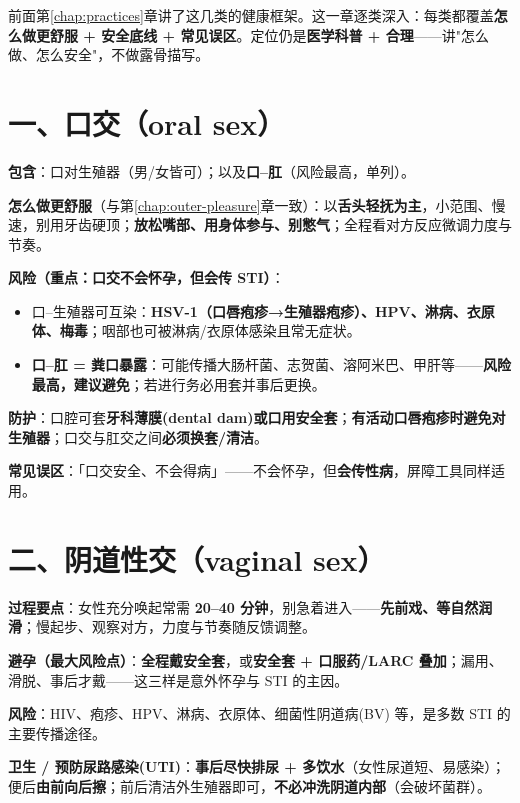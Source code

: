 \label{chap:threeparts}

前面第\ref{chap:practices}章讲了这几类的健康框架。这一章逐类深入：每类都覆盖\textbf{怎么做更舒服 + 安全底线 + 常见误区}。定位仍是\textbf{医学科普 + 合理}——讲"怎么做、怎么安全"，不做露骨描写。

\section{一、口交（oral sex）}

\textbf{包含}：口对生殖器（男/女皆可）；以及\textbf{口--肛}（风险最高，单列）。

\textbf{怎么做更舒服}（与第\ref{chap:outer-pleasure}章一致）：以\textbf{舌头轻抚为主}，小范围、慢速，别用牙齿硬顶；\textbf{放松嘴部、用身体参与、别憋气}；全程看对方反应微调力度与节奏。

\textbf{风险（重点：口交不会怀孕，但会传 STI）}：
\begin{itemize}[leftmargin=2em,itemsep=0.3em]
  \item 口--生殖器可互染：\textbf{HSV-1（口唇疱疹→生殖器疱疹）、HPV、淋病、衣原体、梅毒}；咽部也可被淋病/衣原体感染且常无症状。
  \item \textbf{口--肛 = 粪口暴露}：可能传播大肠杆菌、志贺菌、溶阿米巴、甲肝等——\textbf{风险最高，建议避免}；若进行务必用套并事后更换。
\end{itemize}

\textbf{防护}：口腔可套\textbf{牙科薄膜(dental dam)或口用安全套}；\textbf{有活动口唇疱疹时避免对生殖器}；口交与肛交之间\textbf{必须换套/清洁}。

\textbf{常见误区}：「口交安全、不会得病」——不会怀孕，但\textbf{会传性病}，屏障工具同样适用。

\section{二、阴道性交（vaginal sex）}

\textbf{过程要点}：女性充分唤起常需 \textbf{20--40 分钟}，别急着进入——\textbf{先前戏、等自然润滑}；慢起步、观察对方，力度与节奏随反馈调整。

\textbf{避孕（最大风险点）}：\textbf{全程戴安全套}，或\textbf{安全套 + 口服药/LARC 叠加}；漏用、滑脱、事后才戴——这三样是意外怀孕与 STI 的主因。

\textbf{风险}：HIV、疱疹、HPV、淋病、衣原体、细菌性阴道病(BV) 等，是多数 STI 的主要传播途径。

\textbf{卫生 / 预防尿路感染(UTI)}：\textbf{事后尽快排尿 + 多饮水}（女性尿道短、易感染）；便后\textbf{由前向后擦}；前后清洁外生殖器即可，\textbf{不必冲洗阴道内部}（会破坏菌群）。


